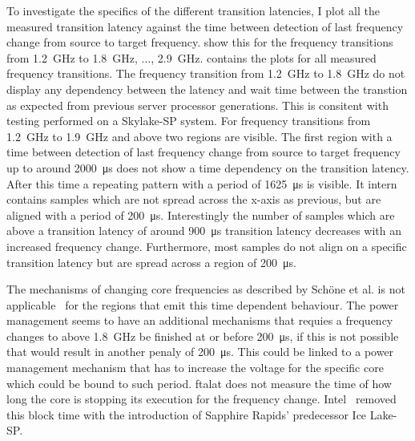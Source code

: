 To investigate the specifics of the different transition latencies, I plot all the measured transition latency against the time between detection of last frequency change from source to target frequency.
 show this for the frequency transitions from \SI{1.2}{\GHz} to \SI{1.8}{\GHz}, ..., \SI{2.9}{\GHz}.
 contains the plots for all measured frequency transitions.
The frequency transition from \SI{1.2}{\GHz} to \SI{1.8}{\GHz} do not display any dependency between the latency and wait time between the transtion as expected from previous server processor generations.
This is consitent with testing performed on a Skylake-SP system.
For frequency transitions from \SI{1.2}{\GHz} to \SI{1.9}{\GHz} and above two regions are visible.
The first region with a time between detection of last frequency change from source to target frequency up to around \SI{2000}{\us} does not show a time dependency on the transition latency.
After this time a repeating pattern with a period of \SI{1625}{\us} is visible.
It intern contains samples which are not spread across the x-axis as previous, but are aligned with a period of \SI{200}{\us}.
Interestingly the number of samples which are above a transition latency of around \SI{900}{\us} transition latency decreases with an increased frequency change.
Furthermore, most samples do not align on a specific transition latency but are spread across a region of \SI{200}{\us}.

The mechanisms of changing core frequencies as described by Schöne et al. is not applicable~\cite{skylake_paper} for the regions that emit this time dependent behaviour.
The power management seems to have an additional mechanisms that requies a frequency changes to above \SI{1.8}{\GHz} be finished at or before \SI{200}{\us}, if this is not possible that would result in another penaly of \SI{200}{\us}.
This could be linked to a power management mechanism that has to increase the voltage for the specific core which could be bound to such period.
ftalat does not measure the time of how long the core is stopping its execution for the frequency change.
Intel~\cite{Intel_2020_IceLake_SP} removed this block time with the introduction of Sapphire Rapids' predecessor Ice Lake-SP.

